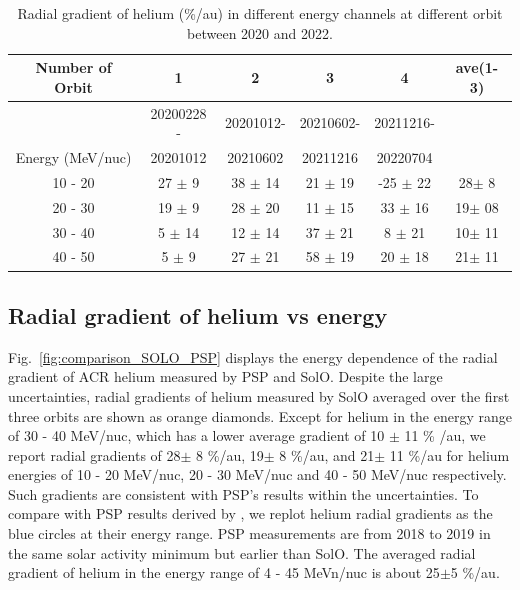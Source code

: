 \begin{table}[!htb]
    \centering
    \begin{tabular}{|c|c|c|c|c|c|}
        \hline
    Number of Orbit     & 1               & 2              & 3               & 4  & ave(1-3)\\
    \hline
                        &20200228 -      & 20201012-        & 20210602-    &  20211216-   &\\  
    Energy (MeV/nuc)    & 20201012        &  20210602       & 20211216      &  20220704  & \\

    \hline
    10 - 20 &  27 $\pm$ 9 & 38 $\pm$ 14 & 21 $\pm$ 19 & -25 $\pm$ 22 & 28$\pm$ 8\\
    \hline
    20 - 30 &  19 $\pm$ 9 & 28 $\pm$ 20 & 11 $\pm$ 15 & 33 $\pm$ 16 & 19$\pm$ 08\\
    \hline
    30 - 40 &  5 $\pm$ 14 & 12 $\pm$ 14 & 37 $\pm$ 21 & 8 $\pm$ 21 & 10$\pm$ 11\\
    \hline
    40 - 50 &  5 $\pm$ 9 & 27 $\pm$ 21 & 58 $\pm$ 19 & 20 $\pm$ 18 & 21$\pm$ 11\\
    \hline
    \end{tabular}
    \caption[Table of helium radial gradient]{Radial gradient of helium (\%/au) in different energy channels at different orbit between 2020 and 2022.}
    \label{Tab:radialgradient_1}
\end{table}
\subsection*{Radial gradient of helium vs energy}

Fig.~\ref{fig:comparison_SOLO_PSP} displays the energy dependence of the radial gradient of \ac{ACR} helium measured by \ac{PSP} and \ac{SolO}. 
Despite the large uncertainties, radial gradients of helium measured by \ac{SolO} averaged over the first three orbits are shown as orange diamonds. Except for helium in the energy range of 30 - 40 MeV/nuc, which has a lower average gradient of 10 $\pm$ 11 \% /au, we report radial gradients of 28$\pm$ 8 \%/au, 19$\pm$ 8 \%/au, and 21$\pm$ 11 \%/au for helium energies of 10 - 20 MeV/nuc, 20 - 30 MeV/nuc and 40 - 50 MeV/nuc respectively.
Such gradients are consistent with \ac{PSP}'s results within the uncertainties.
To compare with \ac{PSP} results derived by \citet{Rankin2021ApJ}, we replot helium radial gradients as the blue circles at their energy range. \ac{PSP} measurements are from 2018 to 2019 in the same solar activity minimum but earlier than \ac{SolO}. The averaged radial gradient of helium in the energy range of 4 - 45 MeVn/nuc is about 25$\pm$5 \%/au. 



